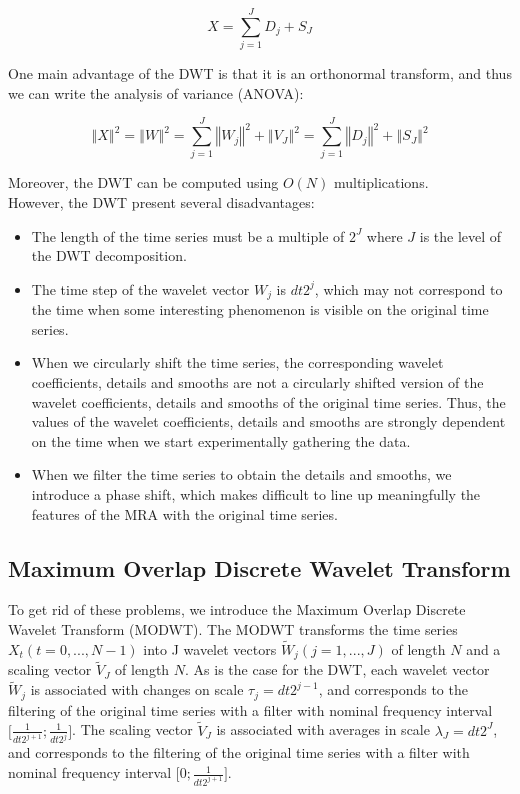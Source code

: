 \documentclass[main.tex]{subfiles}
\begin{document}
\begin{equation}
X = \sum_{j = 1}^{J} D_j + S_J
\end{equation}

One main advantage of the DWT is that it is an orthonormal transform, and thus we can write the analysis of variance (ANOVA):

\begin{equation}
\left\Vert X \right\Vert ^2 = \left\Vert W \right\Vert ^2 = \sum_{j = 1}^{J} \left\Vert W_j \right\Vert ^2 + \left\Vert V_J \right\Vert ^2 = \sum_{j = 1}^{J} \left\Vert D_j \right\Vert ^2 + \left\Vert S_J \right\Vert ^2
\end{equation}

Moreover, the DWT can be computed using $O \left( N \right)$ multiplications. \\

However, the DWT present several disadvantages:

\begin{itemize}
	\item The length of the time series must be a multiple of $2^J$ where $J$ is the level of the DWT decomposition.
	\item The time step of the wavelet vector $W_j$ is $dt 2^j$, which may not correspond to the time when some interesting phenomenon is visible on the original time series.
	\item When we circularly shift the time series, the corresponding wavelet coefficients, details and smooths are not a circularly shifted version of the wavelet coefficients, details and smooths of the original time series. Thus, the values of the wavelet coefficients, details and smooths are strongly dependent on the time when we start experimentally gathering the data.
	\item When we filter the time series to obtain the details and smooths, we introduce a phase shift, which makes difficult to line up meaningfully the features of the MRA with the original time series.
\end{itemize}

\subsection{Maximum Overlap Discrete Wavelet Transform}

To get rid of these problems, we introduce the Maximum Overlap Discrete Wavelet Transform (MODWT). The MODWT transforms the time series $X_t \left( t = 0, ... , N - 1 \right)$ into J wavelet vectors $\widetilde{W}_j \left( j = 1 , ... , J \right)$ of length $N$ and a scaling vector $\widetilde{V}_J$ of length $N$. As is the case for the DWT, each wavelet vector $\widetilde{W}_j$ is associated with changes on scale $\tau_j = dt 2^{j - 1}$, and corresponds to the filtering of the original time series with a filter with nominal frequency interval $\lbrack \frac{1}{dt 2^{j + 1}} ; \frac{1}{dt 2^j} \rbrack$. The scaling vector $\widetilde{V}_J$ is associated with averages in scale $\lambda_J = dt 2^J$, and corresponds to the filtering of the original time series with a filter with nominal frequency interval $\lbrack 0 ; \frac{1}{dt 2^{j + 1}} \rbrack$. \\
\end{document}
